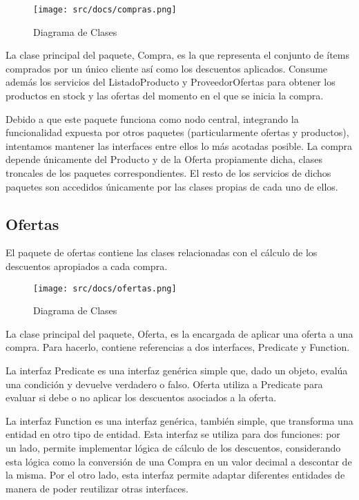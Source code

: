 \documentclass[a4paper,11pt]{article}
\begin{document}
\begin{figure}[!htp]
\begin{center}
\texttt{[image: src/docs/compras.png]}
\end{center}
\caption{Diagrama de Clases} \label{fig:compra}
\end{figure}

\FloatBarrier

La clase principal del paquete, Compra, es la que representa el conjunto de
ítems comprados por un único cliente así como los descuentos aplicados. Consume
además los servicios del ListadoProducto y ProveedorOfertas para obtener los
productos en stock y las ofertas del momento en el que se inicia la compra.

Debido a que este paquete funciona como nodo central, integrando la
funcionalidad expuesta por otros paquetes (particularmente ofertas y
productos), intentamos mantener las interfaces entre ellos lo más acotadas
posible. La compra depende únicamente del Producto y de la Oferta propiamente
dicha, clases troncales de los paquetes correspondientes. El resto de los
servicios de dichos paquetes son accedidos únicamente por las clases propias de
cada uno de ellos.

\subsection{Ofertas}

El paquete de ofertas contiene las clases relacionadas con el cálculo de los
descuentos apropiados a cada compra.

\begin{figure}[!htp]
\begin{center}
\texttt{[image: src/docs/ofertas.png]}
\end{center}
\caption{Diagrama de Clases} \label{fig:oferta}
\end{figure}

\FloatBarrier

La clase principal del paquete, Oferta, es la encargada de aplicar una oferta a
una compra. Para hacerlo, contiene referencias a dos interfaces, Predicate y
Function.

La interfaz Predicate es una interfaz genérica simple que, dado un objeto,
evalúa una condición y devuelve verdadero o falso. Oferta utiliza a Predicate
para evaluar si debe o no aplicar los descuentos asociados a la oferta.

La interfaz Function es una interfaz genérica, también simple, que transforma
una entidad en otro tipo de entidad. Esta interfaz se utiliza para dos
funciones: por un lado, permite implementar lógica de cálculo de los
descuentos, considerando esta lógica como la conversión de una Compra en un valor
decimal a descontar de la misma. Por el otro lado, esta interfaz permite
adaptar diferentes entidades de manera de poder reutilizar otras interfaces.
\end{document}
